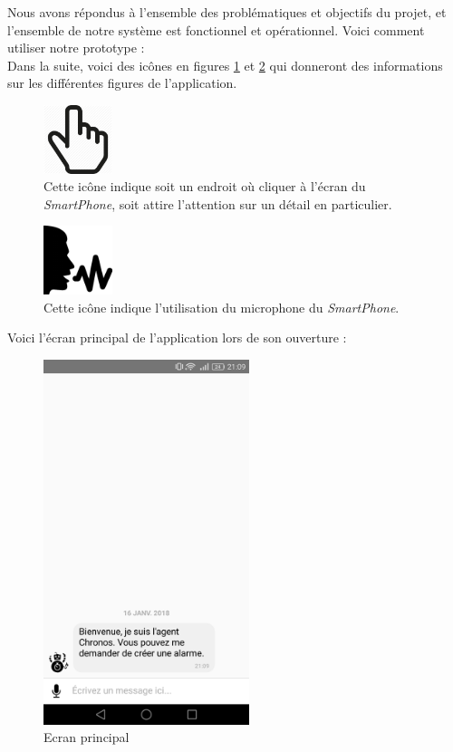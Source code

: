 Nous avons répondus à l'ensemble des problématiques et objectifs du projet, et l'ensemble de notre système est fonctionnel et opérationnel. Voici comment utiliser notre prototype : \\

Dans la suite, voici des icônes en figures \ref{hand} et \ref{voice} qui donneront des informations sur les différentes figures de l'application.

\begin{figure}[H]
  \centering
  \includegraphics[width=2cm]{images/hand.png}
  \caption{Cette icône indique soit un endroit où cliquer à l'écran du \emph{SmartPhone}, soit attire l'attention sur un détail en particulier.}
  \label{hand}
\end{figure}

\begin{figure}[H]
  \centering
  \includegraphics[width=2cm]{images/voice.png}
  \caption{Cette icône indique l'utilisation du microphone du \emph{SmartPhone}.}
  \label{voice}
\end{figure}

Voici l'écran principal de l'application lors de son ouverture :\\

\begin{figure}[H]
  \centering
  \includegraphics[width=6cm]{images/B1.png}
  \caption{Ecran principal}
  \label{B1}
\end{figure}

